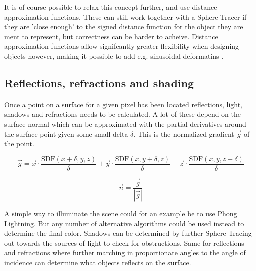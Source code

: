 			It is of course possible to relax this concept further, and use
			distance approximation functions. These can still work together 
			with a Sphere Tracer if they are 'close enough' to the signed 
			distance function for the object they are ment to represent, but
			correctness can be harder to acheive. Distance approximation 
			functions allow signifcantly greater flexibility when designing 
			objects however, making it possible to add e.g. sinusoidal 
			deformatins \cite{TODO}.

		\subsection{Reflections, refractions and shading}

			Once a point on a surface for a given pixel has been located
			reflections, light, shadows and refractions needs to be calculated.
			A lot of these depend on the surface normal which can be
			approximated with the partial derivatives around the surface point
			given some small delta $\delta$. This is the normalized gradient
			$\vec{g}$ of the point.

			$$\vec{g} = \vec{x}\cdot\frac{\text{SDF}(x+\delta, y, z)}{\delta} +
			\vec{y}\cdot\frac{\text{SDF}(x, y+\delta, z)}{\delta} +
			\vec{z}\cdot\frac{\text{SDF}(x, y, z+\delta)}{\delta} $$

			$$\vec{n} = \frac{\vec{g}}{|\vec{g}|} $$

			A simple way to illuminate the scene could for an example be to use
			Phong Lightning\cite{Phong1975}. But any number of alternative
			algorithms could be used instead to determine the final color.
			Shadows can be determined by further Sphere Tracing out towards the
			sources of light to check for obstructions. Same for reflections
			and refractions where further marching in proportionate angles to
			the angle of incidence can determine what objects reflects on the
			surface.

